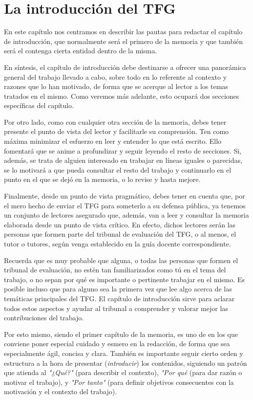 \chapter{La introducción del TFG}
\label{cap:IntroducciónTFG}

En este capítulo nos centramos en describir las pautas para redactar el capítulo de introducción, que normalmente será el primero de la memoria y que también será el contenga cierta entidad dentro de la misma.

En síntesis, el capítulo de introducción debe destinarse a ofrecer una panorámica general del trabajo llevado a cabo, sobre todo en lo referente al contexto y razones que lo han motivado, de forma que se acerque al lector a los temas tratados en el mismo. Como veremos más adelante, esto ocupará dos secciones específicas del capítulo.

Por otro lado, como con cualquier otra sección de la memoria, debes tener presente el punto de vista del lector y facilitarle su comprensión. Ten como máxima minimizar el esfuerzo en leer y entender lo que está escrito. Ello fomentará que se anime a profundizar y seguir leyendo el resto de secciones. Si, además, se trata de alguien interesado en trabajar en líneas iguales o parecidas, se lo motivará a que pueda consultar el resto del trabajo y continuarlo en el punto en el que se dejó en la memoria, o lo revise y hasta mejore.

Finalmente, desde un punto de vista pragmático, debes tener en cuenta que, por el mero hecho de enviar el TFG para someterlo a su defensa pública, ya tenemos un conjunto de lectores asegurado que, además, van a leer y consultar la memoria elaborada desde un punto de vista crítico. En efecto, dichos lectores serán las personas que formen parte del tribunal de evaluación del TFG, o al menos, el tutor o tutores, según venga establecido en la guía docente correspondiente.

Recuerda que es muy probable que alguna, o todas las personas que formen el tribunal de evaluación, no estén tan familiarizados como tú en el tema del trabajo, o no sepan por qué es importante o pertinente trabajar en el mismo. Es posible incluso que para alguno sea la primera vez que lee algo acerca de las temáticas principales del TFG. El capítulo de introducción sirve para aclarar todos estos aspectos y ayudar al tribunal a comprender y valorar mejor las contribuciones del trabajo.

Por esto mismo, siendo el primer capítulo de la memoria, es uno de en los que conviene poner especial cuidado y esmero en la redacción, de forma que sea especialmente ágil, concisa y clara. También es importante seguir cierto orden y estructura a la hora de presentar (\textit{introducir}) los contenidos, siguiendo un patrón que atienda al \textit{"¿Qué?"} (para describir el contexto), \textit{"Por qué} (para dar razón o motivar el trabajo), y \textit{"Por tanto"} (para definir objetivos consecuentes con la motivación y el contexto del trabajo).

